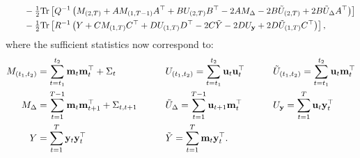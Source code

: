 \documentclass[10pt]{article}
\newcommand{\vy}{\mathbf{y}}
\newcommand{\vm}{\mathbf{m}}
\newcommand{\vu}{\mathbf{u}}
\begin{document}
\begin{appendices}
\begin{align}
   & \qquad
     - \tonehlf \Tr\left[Q\inv
     \left( M_{(2,T)} + A M_{(1,T-1)}A\trp  
     +B U_{(2,T)} B\trp
%
                 -2 A M_\Delta 
                 -2B \tilde U_{(2,T)}
                 + 2B  \tilde U_{\Delta} A\trp \right)\right]
%
                  \nonumber \\
   & \qquad 
                  - \tonehlf \Tr\left[R\inv  \left( Y  
+C M_{(1,T)} C\trp
     +D U_{(1,T)} D\trp %
     -2C \tilde Y 
     -2 D U_{\vy} 
     +2 D \tilde U_{(1,T)} C\trp \right)\right]  ,
     \label{eq:cdllwinput}
\end{align}
where the sufficient statistics now correspond to:
\begin{alignat}{4}
  \label{eq:19}
  M_{(t_1,t_2)} &= \sum_{t=t_1}^{t_2} \vm_t \vm_{t}\trp + \Sigma_{t}
  \qquad && 
  U_{(t_1,t_2)} = \sum_{t=t_1}^{t_2} \vu_t \vu_t\trp 
  \qquad &&
\tilde  U_{(t_1,t_2)} = \sum_{t=t_1}^{t_2} \vu_t \vm_{t}\trp 
   \nonumber \\
   M_\Delta  &= \sum_{t=1}^{T-1} \vm_t \vm_{t+1}\trp + \Sigma_{t,t+1}
  \qquad && 
\tilde U_\Delta = \sum_{t=1}^{T-1} \vu_{t+1} \vm_{t}\trp
  \qquad && 
    U_{\vy}  = \sum_{t=1}^{T} \vu_t \vy_{t}\trp
  \nonumber \\
    Y  &= \sum_{t=1}^{T} \vy_t \vy_{t}\trp
  \qquad && 
  \tilde  Y  = \sum_{t=1}^{T} \vm_{t}\vy_t\trp.
\end{alignat}



\end{appendices}
\end{document}
